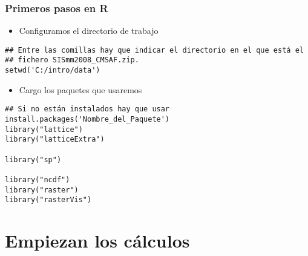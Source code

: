 \documentclass[xcolor={usenames,svgnames,dvipsnames}]{beamer}
\begin{document}
\begin{frame}[fragile]
\frametitle{Primeros pasos en R}
\label{sec-1-3}

\begin{itemize}
\item Configuramos el directorio de trabajo
\end{itemize}

\lstset{language=R}
\begin{lstlisting}
## Entre las comillas hay que indicar el directorio en el que está el
## fichero SISmm2008_CMSAF.zip.
setwd('C:/intro/data')
\end{lstlisting}
\begin{itemize}
\item Cargo los paquetes que usaremos
\end{itemize}

\lstset{language=R}
\begin{lstlisting}
## Si no están instalados hay que usar install.packages('Nombre_del_Paquete')
library("lattice")
library("latticeExtra")

library("sp")

library("ncdf")
library("raster")
library("rasterVis")
\end{lstlisting}
\end{frame}
\section{Empiezan los cálculos}
\label{sec-2}
\end{document}
